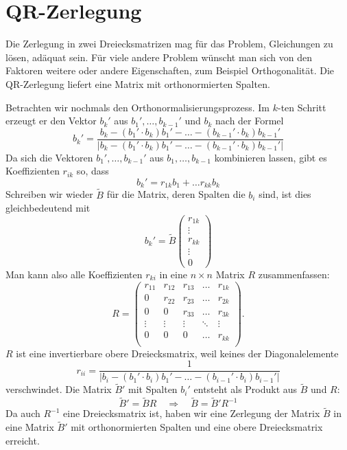 %
%
%
\section{QR-Zerlegung\label{section-qr}}
Die Zerlegung in zwei Dreiecksmatrizen mag für das Problem, Gleichungen
zu lösen, adäquat sein.
Für viele andere Problem wünscht man
sich von den Faktoren weitere oder andere Eigenschaften, zum Beispiel
Orthogonalität.
Die QR-Zerlegung liefert eine Matrix mit orthonormierten Spalten.

Betrachten wir nochmals den Orthonormalisierungsprozess.
Im $k$-ten Schritt erzeugt er den Vektor $b_k'$ aus $b_1',\dots,b_{k-1}'$
und $b_k$ nach der Formel
\[
b_k'=\frac{
b_k-(b_1'\cdot b_k)b_1'-\dots-(b_{k-1}'\cdot b_k)b_{k-1}'
}{|
b_k-(b_1'\cdot b_k)b_1'-\dots-(b_{k-1}'\cdot b_k)b_{k-1}'
|}
\]
Da sich die Vektoren $b_1',\dots,b_{k-1}'$ aus 
$b_1,\dots,b_{k-1}$ kombinieren lassen, gibt es Koeffizienten $r_{ik}$
so, dass
\[
b_k'=r_{1k}b_1+\dots r_{kk}b_k
\]
Schreiben wir wieder $\tilde B$ für die Matrix, deren Spalten die
$b_i$ sind, ist dies gleichbedeutend mit
\[
b_k'=\tilde B\begin{pmatrix}r_{1k}\\\vdots\\r_{kk}\\\vdots\\0\end{pmatrix}
\]
Man kann also alle Koeffizienten $r_{ki}$ in eine $n\times n$ Matrix $R$
zusammenfassen:
\[
R=\begin{pmatrix}
r_{11}&r_{12}&r_{13}&\dots &r_{1k}\\
0     &r_{22}&r_{23}&\dots &r_{2k}\\
0     &0     &r_{33}&\dots &r_{3k}\\
\vdots&\vdots&\vdots&\ddots&\vdots\\
0     &0     &0     &\dots &r_{kk}\\
\end{pmatrix}.
\]
$R$ ist eine invertierbare
obere Dreiecksmatrix, weil keines der
Diagonalelemente
\[
r_{ii}=\frac1{|
b_i-(b_1'\cdot b_i)b_1'-\dots-(b_{i-1}'\cdot b_i)b_{i-1}'
|}
\]
verschwindet.
Die Matrix $\tilde B'$ mit Spalten $b_i'$ entsteht als Produkt aus $\tilde B$
und $R$:
\[
\tilde B'=\tilde BR
\quad\Rightarrow\quad
\tilde B=\tilde B'R^{-1}
\]
Da auch $R^{-1}$ eine Dreiecksmatrix ist, haben wir eine Zerlegung der
Matrix $\tilde B$ in eine Matrix $\tilde B'$ mit orthonormierten
Spalten und eine obere Dreiecksmatrix erreicht.


